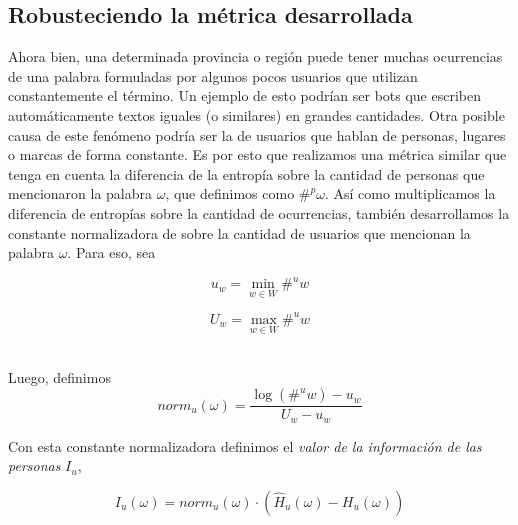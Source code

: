\subsection{Robusteciendo la métrica desarrollada}

Ahora bien, una determinada provincia o región puede tener muchas ocurrencias de una palabra formuladas por algunos pocos usuarios que utilizan constantemente el término. Un ejemplo de esto podrían ser bots que escriben automáticamente textos iguales (o similares) en grandes cantidades. Otra posible causa de este fenómeno podría ser la de usuarios que hablan de personas, lugares o marcas de forma constante.
Es por esto que realizamos una métrica similar que tenga en cuenta la diferencia de la entropía sobre la cantidad de personas que mencionaron la palabra $\omega$, que definimos como $\#^p \omega$. Así como multiplicamos la diferencia de entropías sobre la cantidad de ocurrencias, también desarrollamos la constante normalizadora de sobre la cantidad de usuarios que mencionan la palabra $\omega$. 
Para eso, sea %

\noindent\begin{minipage}{.5\linewidth}
\begin{equation}
  u_w = \min \limits_{w \in W} \#^u w
\end{equation}
\end{minipage}%
\begin{minipage}{.5\linewidth}
\begin{equation}
  U_w = \max \limits_{w \in W} \#^u w
\end{equation}
\end{minipage}\\

Luego, definimos
\begin{equation}
norm_u(\omega) = \frac{\log(\#^u w) - u_w}{U_w - u_w}  
\label{eq:norm2}
\end{equation}

Con esta constante normalizadora definimos el \textit{valor de la información de las personas} $I_u$,

\begin{equation}
I_u(\omega) = norm_{u}(\omega) \cdot (\widehat{H}_{u}(\omega) - H_{u}(\omega))
\label{eq:iu}
\end{equation}



